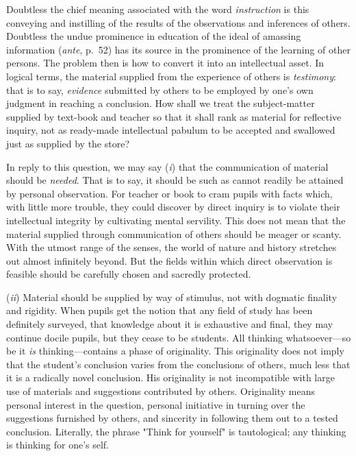 \documentclass[letterpaper]{book}
\begin{document}

Doubtless the chief meaning associated with the word \emph{instruction}
is this conveying and instilling of the results of the observations and
inferences of others. Doubtless the undue prominence in education of the
ideal of amassing information (\emph{ante}, p.\ 52) has its source in the
prominence of the learning of other persons. The problem then is how to
convert it into an intellectual asset. In logical terms, the material
supplied from the experience of others is \emph{testimony}: that is to
say, \emph{evidence} submitted by others to be employed by one's own
judgment in reaching a conclusion. How shall we treat the subject-matter
supplied by text-book and teacher so that it shall rank as material for
reflective
inquiry, not as ready-made intellectual pabulum to be accepted and
swallowed just as supplied by the store?


In reply to this question, we may say (\emph{i}) that the communication
of material should be \emph{needed}. That is to say, it should be such
as cannot readily be attained by personal observation. For teacher or
book to cram pupils with facts which, with little more trouble, they
could discover by direct inquiry is to violate their intellectual
integrity by cultivating mental servility. This does not mean that the
material supplied through communication of others should be meager or
scanty. With the utmost range of the senses, the world of nature and
history stretches out almost infinitely beyond. But the fields within
which direct observation is feasible should be carefully chosen and
sacredly protected.


(\emph{ii}) Material should be supplied by way of stimulus, not with
dogmatic finality and rigidity. When pupils get the notion that any
field of study has been definitely surveyed, that knowledge about it is
exhaustive and final, they may continue docile pupils, but they cease to
be students. All thinking whatsoever---so be it \emph{is}
thinking---contains a phase of originality. This originality does not
imply that the student's conclusion varies from the conclusions of
others, much less that it is a radically novel conclusion. His
originality is not incompatible with large use of materials and
suggestions contributed by others. Originality means personal interest
in the question, personal initiative in turning over the suggestions
furnished by others, and sincerity in following them out to a tested
conclusion. Literally, the phrase "Think for yourself" is tautological;
any thinking is thinking for one's
self.
\end{document}
